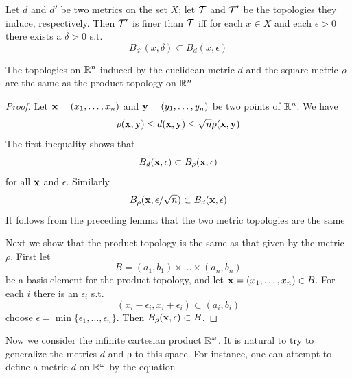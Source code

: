 \documentclass[11pt]{article}
\begin{document}
\begin{lemma}[]
Let \(d\) and \(d'\) be two metrics on the set \(X\); let \(\mathcal{T}\) and \(\mathcal{T}'\) be the topologies they
induce, respectively. Then \(\mathcal{T}'\) is finer than \(\mathcal{T}\) iff for each \(x\in X\) and each \(\epsilon>0\)
there exists a \(\delta>0\) s.t.
\begin{equation*}
B_{d'}(x,\delta)\subset B_d(x,\epsilon)
\end{equation*}
\end{lemma}

\begin{theorem}[]
The topologies on \(\mathbb{R}^n\) induced by the euclidean metric \(d\) and the square metric \(\rho\) are the
same as the product topology on \(\mathbb{R}^n\)
\end{theorem}

\begin{proof}
Let \(\operatorname{\textbf{x}}=(x_1,\dots,x_n)\) and \(\operatorname{\textbf{y}}=(y_1,\dots,y_n)\) be two points of \(\mathbb{R}^n\). We have
\begin{equation*}
\rho(\operatorname{\textbf{x}},\operatorname{\textbf{y}})\le d(\operatorname{\textbf{x}},\operatorname{\textbf{y}})\le\sqrt{n}\rho(\operatorname{\textbf{x}},\operatorname{\textbf{y}})
\end{equation*}
The first inequality shows that
\begin{equation*}
B_d(\operatorname{\textbf{x}},\epsilon)\subset B_\rho(\operatorname{\textbf{x}},\epsilon)
\end{equation*}
for all \(\operatorname{\textbf{x}}\) and \(\epsilon\). Similarly
\begin{equation*}
B_\rho(\operatorname{\textbf{x}},\epsilon/\sqrt{n})\subset B_d(\operatorname{\textbf{x}},\epsilon)
\end{equation*}
It follows from the preceding lemma that the two metric topologies are the same

Next we show that the product topology is the same as that given by the metric \(\rho\). First let
\begin{equation*}
B=(a_1,b_1)\times\dots\times(a_n,b_n)
\end{equation*}
be a basis element for the product topology, and let \(\operatorname{\textbf{x}}=(x_1,\dots,x_n)\in B\). For each \(i\) there is
an \(\epsilon_i\) s.t.
\begin{equation*}
(x_i-\epsilon_i,x_i+\epsilon_i)\subset (a_i,b_i)
\end{equation*}
choose \(\epsilon=\min\{\epsilon_1,\dots,\epsilon_n\}\). Then \(B_\rho(\operatorname{\textbf{x}},\epsilon)\subset B\).
\end{proof}

Now we consider the infinite cartesian product \(\mathbb{R}^\omega\). It is natural to try to generalize the
metrics \(d\) and ρ to this space. For instance, one can attempt to define a metric \(d\)
on \(\mathbb{R}^\omega\) by the equation
\end{document}
